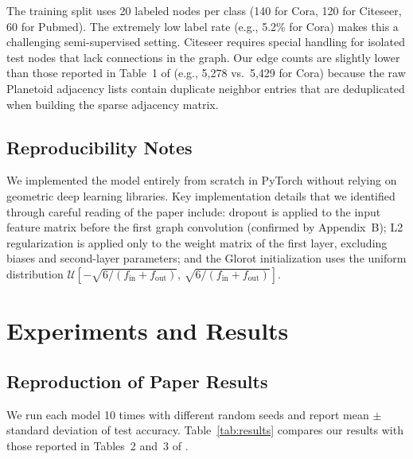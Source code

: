 \documentclass[10pt,twocolumn]{article}
\begin{document}
The training split uses 20 labeled nodes per class (140 for Cora, 120 for Citeseer, 60 for Pubmed).
The extremely low label rate (e.g., 5.2\% for Cora) makes this a challenging semi-supervised setting.
Citeseer requires special handling for isolated test nodes that lack connections in the graph.
Our edge counts are slightly lower than those reported in Table~1 of \citet{kipf2017semi} (e.g., 5{,}278 vs.\ 5{,}429 for Cora) because the raw Planetoid adjacency lists contain duplicate neighbor entries that are deduplicated when building the sparse adjacency matrix.

\subsection{Reproducibility Notes}

We implemented the model entirely from scratch in PyTorch without relying on geometric deep learning libraries.
Key implementation details that we identified through careful reading of the paper include: dropout is applied to the input feature matrix before the first graph convolution (confirmed by Appendix~B); L2 regularization is applied only to the weight matrix of the first layer, excluding biases and second-layer parameters; and the Glorot initialization uses the uniform distribution $\mathcal{U}[-\sqrt{6/(f_{\text{in}}+f_{\text{out}})},\, \sqrt{6/(f_{\text{in}}+f_{\text{out}})}]$.

\section{Experiments and Results}
\label{sec:experiments}

\subsection{Reproduction of Paper Results}

We run each model 10 times with different random seeds and report mean $\pm$ standard deviation of test accuracy.
Table~\ref{tab:results} compares our results with those reported in Tables~2 and~3 of \citet{kipf2017semi}.
\end{document}
